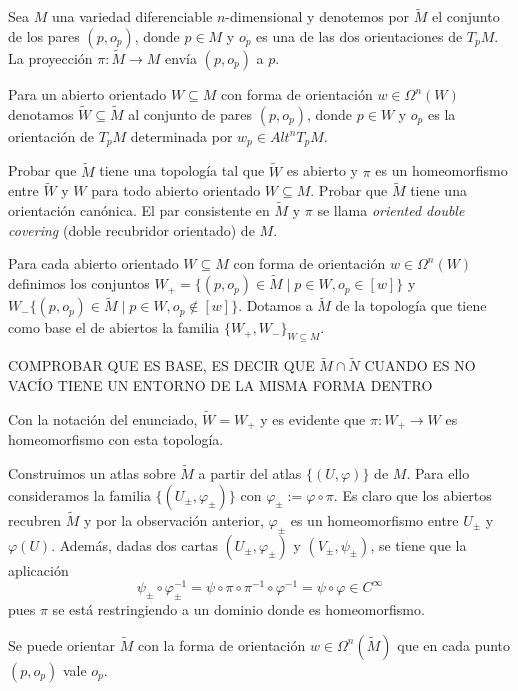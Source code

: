 \documentclass[twoside]{article}
\begin{document}
\begin{ejercicio}{9.15}
Sea $M$ una variedad diferenciable $n$-dimensional y denotemos por $\widetilde{M}$ el conjunto de los pares $(p, o_p)$, donde $p\in M$ y $o_p$ es una de las dos orientaciones de $T_pM$. La proyección $\pi:\widetilde{M}\to M$ envía $(p,o_p)$ a $p$. 

Para un abierto orientado $W\subseteq M$ con forma de orientación $w\in\Omega^n(W)$ denotamos $\widetilde{W}\subseteq\widetilde{M}$ al conjunto de pares $(p,o_p)$, donde $p\in W$ y $o_p$ es la orientación de $T_pM$ determinada por $w_p\in Alt^n T_pM$.

Probar que $\widetilde{M}$ tiene una topología tal que $\widetilde{W}$ es abierto y $\pi$ es un homeomorfismo entre $\widetilde{W}$ y $W$ para todo abierto orientado $W\subseteq M$. Probar que $\widetilde{M}$ tiene una orientación canónica. El par consistente en $\widetilde{M}$ y $\pi$ se llama \emph{oriented double covering} (doble recubridor orientado) de $M$.
\end{ejercicio}
\begin{solucion}
Para cada abierto orientado $W\subseteq M$ con forma de orientación $w\in\Omega^n(W)$ definimos los conjuntos $W_+=\{(p,o_p)\in\widetilde{M}\mid p\in W, o_p\in [w]\}$ y $W_-\{(p,o_p)\in\widetilde{M}\mid p\in W, o_p\notin[w]\}$. Dotamos a $\widetilde{M}$ de la topología que tiene como base el de abiertos la familia $\{W_+,W_-\}_{W\subseteq M}$.

COMPROBAR QUE ES BASE, ES DECIR QUE $\widetilde{M}\cap\widetilde{N}$ CUANDO ES NO VACÍO TIENE UN ENTORNO DE LA MISMA FORMA DENTRO

 Con la notación del enunciado, $\widetilde{W}=W_+$ y es evidente que $\pi:W_+\to W$ es homeomorfismo con esta topología.

Construimos un atlas sobre $\widetilde{M}$ a partir del atlas $\{(U,\varphi)\}$ de $M$. Para ello consideramos la familia $\{(U_\pm, \varphi_\pm)\}$ con $\varphi_\pm:=\varphi\circ\pi$. Es claro que los abiertos recubren $\widetilde{M}$ y por la observación anterior, $\varphi_\pm$ es un homeomorfismo entre $U_\pm$ y $\varphi(U)$. Además, dadas dos cartas $(U_\pm,\varphi_\pm)$ y $(V_\pm,\psi_\pm)$, se tiene que la aplicación
\[
\psi_\pm\circ \varphi_\pm^{-1}=\psi\circ\pi\circ\pi^{-1}\circ\varphi^{-1}=\psi\circ\varphi\in C^{\infty}
\]
pues $\pi$ se está restringiendo a un dominio donde es homeomorfismo.

Se puede orientar $\widetilde{M}$ con la forma de orientación $w\in\Omega^n(\widetilde{M})$ que en cada punto $(p,o_p)$ vale $o_p$. 


\end{solucion}
\newpage
\end{document}
